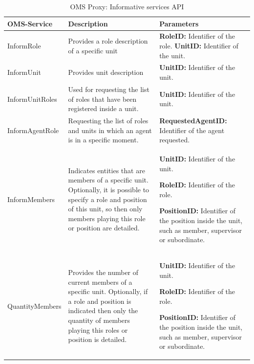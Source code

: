 \begin{table}[h!t]
\begin{tabular}{|l|p{5cm}|p{5cm}|}
\hline
OMS-Service & Description & Parameters \\ \hline

InformRole & Provides a role description of a specific unit
&

\textbf{RoleID:} Identifier of the role.
\textbf{UnitID:} Identifier of the unit.

\\ \hline

InformUnit & Provides unit description
&

\textbf{UnitID:} Identifier of the unit.

\\ \hline

InformUnitRoles & Used for requesting the list of roles that have been registered inside a unit.
&

\textbf{UnitID: }Identifier of the unit.

\\ \hline


InformAgentRole & Requesting the list of roles and units in which an agent is in a specific moment.
&

\textbf{RequestedAgentID: } Identifier of the agent requested.

\\ \hline
InformMembers & Indicates entities that are members of a specific unit. Optionally, it is possible to specify a role and position of this unit, so then only members playing this role or position are detailed.
 &

\textbf{UnitID:} Identifier of the unit.

\textbf{RoleID:} Identifier of the role.

\textbf{PositionID:} Identifier of the position inside the unit, such as member, supervisor or subordinate.

\\ \hline
 QuantityMembers & Provides the number of current members of a specific unit. Optionally, if a role and position is indicated then only the quantity of members playing this roles or position is detailed.
 &

\textbf{UnitID:} Identifier of the unit.

\textbf{RoleID:} Identifier of the role.

\textbf{PositionID:} Identifier of the position inside the unit, such as member, supervisor or subordinate.

\\ \hline

\end{tabular}
\caption{OMS Proxy: Informative services API}
\label{tab:thomas_OMSProxy_information}
\end{table}


